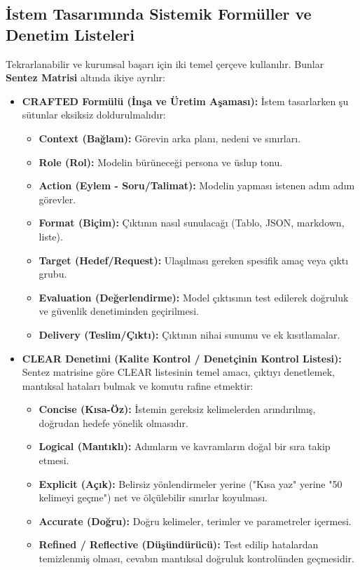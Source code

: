 \documentclass[11pt,a4paper,openany]{book}
\begin{document}
\subsection{İstem Tasarımında Sistemik Formüller ve Denetim Listeleri}
Tekrarlanabilir ve kurumsal başarı için iki temel çerçeve kullanılır. Bunlar \textbf{Sentez Matrisi} altında ikiye ayrılır:
\begin{itemize}
    \item \textbf{CRAFTED Formülü (İnşa ve Üretim Aşaması):} İstem tasarlarken şu sütunlar eksiksiz doldurulmalıdır:
        \begin{itemize}
            \item \textbf{Context (Bağlam):} Görevin arka planı, nedeni ve sınırları.
            \item \textbf{Role (Rol):} Modelin bürüneceği persona ve üslup tonu.
            \item \textbf{Action (Eylem - Soru/Talimat):} Modelin yapması istenen adım adım görevler.
            \item \textbf{Format (Biçim):} Çıktının nasıl sunulacağı (Tablo, JSON, markdown, liste).
            \item \textbf{Target (Hedef/Request):} Ulaşılması gereken spesifik amaç veya çıktı grubu.
            \item \textbf{Evaluation (Değerlendirme):} Model çıktısının test edilerek doğruluk ve güvenlik denetiminden geçirilmesi.
            \item \textbf{Delivery (Teslim/Çıktı):} Çıktının nihai sunumu ve ek kısıtlamalar.
        \end{itemize}
    \item \textbf{CLEAR Denetimi (Kalite Kontrol / Denetçinin Kontrol Listesi):} Sentez matrisine göre CLEAR listesinin temel amacı, çıktıyı denetlemek, mantıksal hataları bulmak ve komutu rafine etmektir:
        \begin{itemize}
            \item \textbf{Concise (Kısa-Öz):} İstemin gereksiz kelimelerden arındırılmış, doğrudan hedefe yönelik olmasıdır.
            \item \textbf{Logical (Mantıklı):} Adımların ve kavramların doğal bir sıra takip etmesi.
            \item \textbf{Explicit (Açık):} Belirsiz yönlendirmeler yerine ("Kısa yaz" yerine "50 kelimeyi geçme") net ve ölçülebilir sınırlar koyulması.
            \item \textbf{Accurate (Doğru):} Doğru kelimeler, terimler ve parametreler içermesi.
            \item \textbf{Refined / Reflective (Düşündürücü):} Test edilip hatalardan temizlenmiş olması, cevabın mantıksal doğruluk kontrolünden geçmesidir.
        \end{itemize}
\end{itemize}
\end{document}
